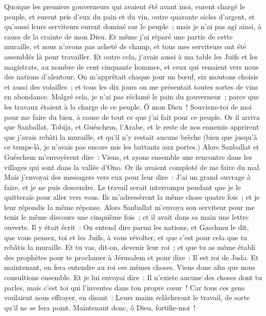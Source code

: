 \begin{multicols}{2}
Quoique les premiers gouverneurs qui avaient été avant moi, eurent chargé le peuple, et eurent pris d'eux du pain et du vin, outre quarante sicles d'argent, et qu'aussi leurs serviteurs eurent dominé sur le peuple~; mais je n'ai pas agi ainsi, à cause de la crainte de mon Dieu.
Et même j'ai réparé une partie de cette muraille, et nous n'avons pas acheté de champ, et tous mes serviteurs ont été assemblés là pour travailler.
Et outre cela, j'avais aussi à ma table les Juifs et les magistrats, au nombre de cent cinquante hommes, et ceux qui venaient vers nous des nations d'alentour.
On m'apprêtait chaque jour un bœuf, six moutons choisis et aussi des volailles~; et tous les dix jours on me présentait toutes sortes de vins en abondance. Malgré cela, je n'ai pas réclamé le pain du gouverneur~; parce que les travaux étaient à la charge de ce peuple.
Ô mon Dieu~! Souviens-toi de moi pour me faire du bien, à cause de tout ce que j'ai fait pour ce peuple.
\VerseOne{}Or il arriva que Sanballat, Tobija, et Guéschem, l'Arabe, et le reste de nos ennemis apprirent que j'avais rebâti la muraille, et qu'il n'y restait aucune brèche (bien que jusqu'à ce temps-là, je n'avais pas encore mis les battants aux portes.)
Alors Sanballat et Guéschem m'envoyèrent dire~: Viens, et ayons ensemble une rencontre dans les villages qui sont dans la vallée d'Ono. Or ils avaient comploté de me faire du mal.
Mais j'envoyai des messagers vers eux pour leur dire~: J'ai un grand ouvrage à faire, et je ne puis descendre. Le travail serait interrompu pendant que je le quitterais pour aller vers vous.
Ils m'adressèrent la même chose quatre fois~; et je leur répondis la même réponse.
Alors Sanballat m'envoya son serviteur pour me tenir le même discours une cinquième fois~; et il avait dans sa main une lettre ouverte.
Il y était écrit~: On entend dire parmi les nations, et Gaschmu le dit, que vous pensez, toi et les Juifs, à vous révolter, et que c'est pour cela que tu rebâtis la muraille. Et tu vas, dit-on, devenir leur roi~;
et que tu as même établi des prophètes pour te proclamer à Jérusalem et pour dire~: Il est roi de Juda. Et maintenant, on fera entendre au roi ces mêmes choses. Viens donc afin que nous consultions ensemble.
Et je lui envoyai dire~: Il n'existe aucune des choses dont tu parles, mais c'est toi qui l'inventes dans ton propre cœur~!
Car tous ces gens voulaient nous effrayer, en disant~: Leurs mains relâcheront le travail, de sorte qu'il ne se fera point. Maintenant donc, ô Dieu, fortifie-moi~!

\end{multicols}
